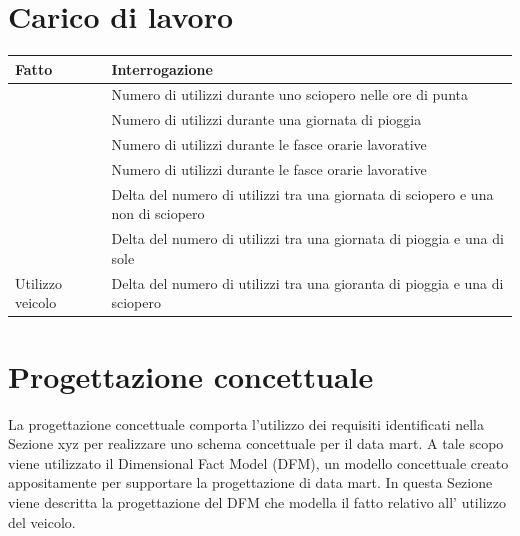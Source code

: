 \section{Carico di lavoro}
\begin{table}[h]
\centering
\begin{tabular}{|l|l|}
\hline
\rowcolor[HTML]{3166FF} 
{\color[HTML]{FFFFFF} \textbf{Fatto}} & {\color[HTML]{FFFFFF} \textbf{Interrogazione}}                                  \\ \hline
                                      & Numero di utilizzi durante uno sciopero nelle ore di punta                      \\ \cline{2-2} 
                                      & Numero di utilizzi durante una giornata di pioggia                              \\ \cline{2-2} 
                                      & Numero di utilizzi durante le fasce orarie lavorative                           \\ \cline{2-2} 
                                      & Numero di utilizzi durante le fasce orarie lavorative                           \\ \cline{2-2} 
                                      & Delta del numero di utilizzi tra una giornata di sciopero e una non di sciopero \\ \cline{2-2} 
                                      & Delta del numero di utilizzi tra una giornata di pioggia e una di sole          \\ \cline{2-2} 
\multirow{-7}{*}{Utilizzo veicolo}    & Delta del numero di utilizzi tra una gioranta di pioggia e una di sciopero      \\ \hline
\end{tabular}
\end{table}
\section{Progettazione concettuale}
La progettazione concettuale comporta l’utilizzo dei requisiti identificati nella Sezione xyz
per realizzare uno schema concettuale per il data mart. A tale scopo viene utilizzato il
Dimensional Fact Model (DFM), un modello concettuale creato appositamente per supportare la progettazione di data mart. 
In questa Sezione viene descritta la progettazione del DFM che modella il fatto relativo all' utilizzo del veicolo.

